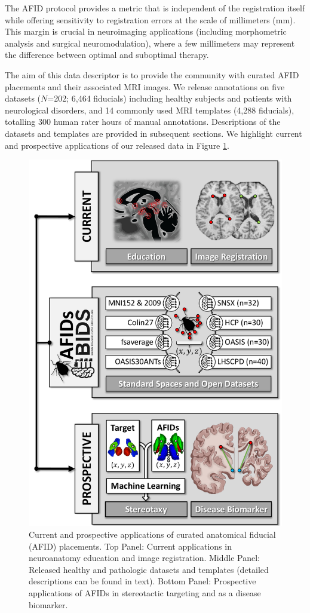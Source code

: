 The AFID protocol provides a metric that is independent of the registration itself while offering sensitivity to registration errors at the scale of millimeters (mm). This margin is crucial in neuroimaging applications (including morphometric analysis and surgical neuromodulation), where a few millimeters may represent the difference between optimal and suboptimal therapy.

The aim of this data descriptor is to provide the community with curated AFID placements and their associated MRI images. We release annotations on five datasets (\(N\)=202; 6,464 fiducials) including healthy subjects and patients with neurological disorders, and 14 commonly used MRI templates (4,288 fiducials), totalling 300 human rater hours of manual annotations. Descriptions of the datasets and templates are provided in subsequent sections. We highlight current and prospective applications of our released data in Figure \ref{fig:ch2_Figure_1}.

\begin{figure}[hbt!]
    \centering
    \includegraphics[width=0.85\linewidth]{figs/ch2_Figure_1.pdf}
    \caption{Current and prospective applications of curated anatomical fiducial (AFID) placements. Top Panel: Current applications in neuroanatomy education and image registration. Middle Panel: Released healthy and pathologic datasets and templates (detailed descriptions can be found in text). Bottom Panel: Prospective applications of AFIDs in stereotactic targeting and as a disease biomarker.}
    \label{fig:ch2_Figure_1}
\end{figure}


